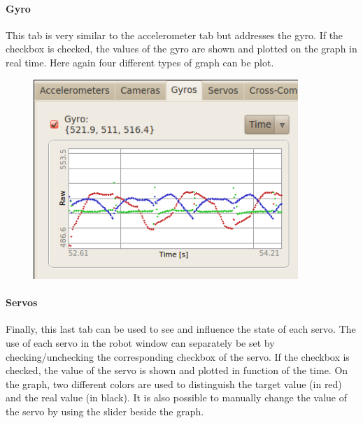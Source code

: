 \documentclass[a4paper, 12pt]{article}  		%
\begin{document}
\paragraph*{Gyro}
This tab is very similar to the accelerometer tab but addresses the gyro. If the checkbox is checked, the values of the gyro are shown and plotted on the graph in real time. Here again four different types of graph can be plot. \\

\begin{figure}[H]
\begin{center}
\includegraphics[width=10cm]{window_gyro.png}
\label{window_gyro}
\end{center}
\end{figure}

\newpage
\paragraph*{Servos}
Finally, this last tab can be used to see and influence the state of each servo. The use of each servo in the robot window can separately be set by checking/unchecking the corresponding checkbox of the servo. If the checkbox is checked, the value of the servo is shown and plotted in function of the time. On the graph, two different colors are used to distinguish the target value (in red) and the real value (in black). It is also possible to manually change the value of the servo by using the slider beside the graph.\\
\end{document}
